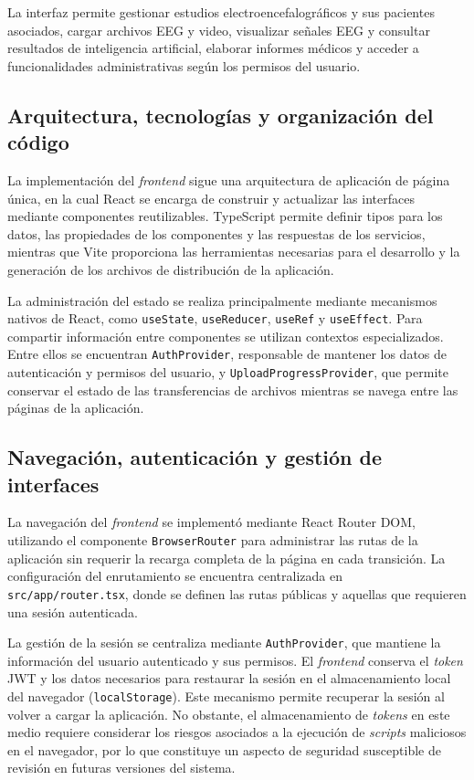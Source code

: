 La interfaz permite gestionar estudios
electroencefalográficos y sus pacientes
asociados, cargar archivos EEG y video,
visualizar señales EEG y consultar resultados de inteligencia artificial, elaborar informes médicos y
acceder a funcionalidades administrativas
según los permisos del usuario.

\subsection{Arquitectura, tecnologías y organización del código}

La implementación del \textit{frontend} sigue una arquitectura
de aplicación de página única, en la cual React se
encarga de construir y actualizar las interfaces
mediante componentes reutilizables. TypeScript
permite definir tipos para los datos, las propiedades
de los componentes y las respuestas de los servicios,
mientras que Vite proporciona las herramientas
necesarias para el desarrollo y la generación de
los archivos de distribución de la aplicación.

La administración del estado se realiza principalmente
mediante mecanismos nativos de React, como
\texttt{useState}, \texttt{useReducer},
\texttt{useRef} y \texttt{useEffect}.
Para compartir información entre componentes
se utilizan contextos especializados.
Entre ellos se encuentran \texttt{AuthProvider},
responsable de mantener los datos de autenticación
y permisos del usuario, y
\texttt{UploadProgressProvider}, que permite
conservar el estado de las transferencias de
archivos mientras se navega entre las páginas
de la aplicación.

\subsection{Navegación, autenticación y gestión de interfaces}

La navegación del \textit{frontend} se implementó mediante
React Router DOM, utilizando el componente
\texttt{BrowserRouter} para administrar las rutas
de la aplicación sin requerir la recarga completa
de la página en cada transición. La configuración
del enrutamiento se encuentra centralizada en
\texttt{src/app/router.tsx}, donde se definen
las rutas públicas y aquellas que requieren
una sesión autenticada.

La gestión de la sesión se centraliza mediante
\texttt{AuthProvider}, que mantiene la información
del usuario autenticado y sus permisos. El \textit{frontend}
conserva el \textit{token} JWT y los datos necesarios para
restaurar la sesión en el almacenamiento local del
navegador (\texttt{localStorage}). Este mecanismo
permite recuperar la sesión al volver a cargar la
aplicación. No obstante, el almacenamiento de \textit{tokens}
en este medio requiere considerar los riesgos asociados
a la ejecución de \textit{scripts} maliciosos en el navegador,
por lo que constituye un aspecto de seguridad
susceptible de revisión en futuras versiones del sistema.

